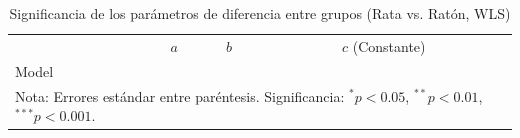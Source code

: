 \begin{table}[htbp]
\caption{Significancia de los parámetros de diferencia entre grupos (Rata vs. Ratón, WLS)}
\label{tab:group_diff}
\begin{tabular}{lccc}
\toprule
 & $a$ & $b$ & $c$ (Constante) \\
Model &  &  &  \\
\midrule
\multicolumn{4}{l}{\footnotesize Nota: Errores estándar entre paréntesis. Significancia: $^{*}p<0.05$, $^{**}p<0.01$, $^{***}p<0.001$.} \\
\bottomrule
\end{tabular}
\end{table}
